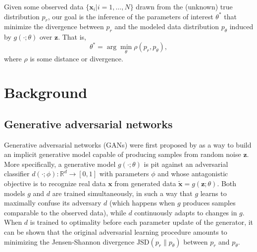 \documentclass[twocolumn,superscriptaddress,aps]{revtex4-1}
\theoremstyle{plain}
\begin{document}
Given some observed data $\{ \mathbf{x}_i | i=1, \dots, N \}$ drawn from the
(unknown) true distribution $p_r$, our goal is the inference of the parameters
of interest $\theta^*$ that minimize the divergence between $p_r$ and
the modeled data distribution $p_\theta$ induced by $g(\cdot;
\theta)$ over $\mathbf{z}$. That is,
\begin{equation}
    \theta^* = \arg \min_\theta \rho(p_r, p_\theta),
\end{equation}
where $\rho$ is some distance or divergence.



\section{Background}

\subsection{Generative adversarial networks}
\label{sec:gans}

Generative adversarial networks (GANs) were first proposed by
\cite{goodfellow2014generative} as a way to build an implicit generative model
capable of producing samples from random noise $\mathbf{z}$. More specifically,
a generative model $g(\cdot; \theta)$ is pit against an adversarial
classifier $d(\cdot; \phi):\mathbb{R}^d \to [0,1]$ with parameters $\phi$ and whose antagonistic objective is to recognize real data $\mathbf{x}$
from generated data $\tilde{\mathbf{x}} = g(\mathbf{z}; \theta)$. Both models $g$ and $d$
are trained simultaneously, in such a way that $g$ learns to maximally confuse
its adversary $d$ (which happens when $g$ produces samples comparable to the
observed data), while $d$ continuously adapts to changes in $g$. When $d$ is
trained to optimality before each parameter update of the generator, it can
be shown that the original adversarial learning procedure amounts to minimizing
the Jensen-Shannon divergence $\text{JSD}(p_r \parallel p_\theta)$ between $p_r$ and $p_\theta$.
\end{document}
